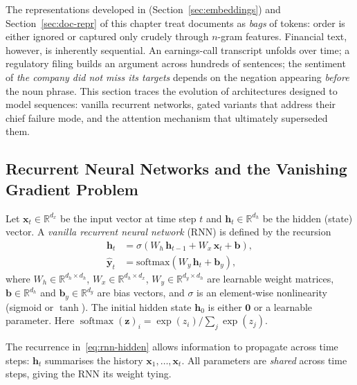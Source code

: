 \begin{deepdive}

The representations developed in  (Section~\ref{sec:embeddings}) and
Section~\ref{sec:doc-repr} of this chapter treat documents as \emph{bags} of tokens:
order is either ignored or captured only crudely through $n$-gram features.
Financial text, however, is inherently sequential.
An earnings-call transcript unfolds over time; a regulatory filing builds an argument
across hundreds of sentences; the sentiment of \textit{the company did not miss its
targets} depends on the negation appearing \emph{before} the noun phrase.
This section traces the evolution of architectures designed to model sequences:
vanilla recurrent networks, gated variants that address their chief failure mode,
and the attention mechanism that ultimately superseded them.

\subsection{Recurrent Neural Networks and the Vanishing Gradient Problem}
\label{sec:sequential-rnn}

\begin{definition}
\label{def:rnn}
Let $\mathbf{x}_t \in \mathbb{R}^{d_x}$ be the input vector at time step $t$
and $\mathbf{h}_t \in \mathbb{R}^{d_h}$ be the hidden (state) vector.
A \emph{vanilla recurrent neural network} (RNN) is defined by the recursion
\begin{align}
  \mathbf{h}_t &= \sigma\!\left(W_h\,\mathbf{h}_{t-1} + W_x\,\mathbf{x}_t
    + \mathbf{b}\right), \label{eq:rnn-hidden}\\
  \hat{\mathbf{y}}_t &= \mathrm{softmax}\!\left(W_y\,\mathbf{h}_t
    + \mathbf{b}_y\right), \label{eq:rnn-output}
\end{align}
where $W_h \in \mathbb{R}^{d_h \times d_h}$, $W_x \in \mathbb{R}^{d_h \times d_x}$,
$W_y \in \mathbb{R}^{d_y \times d_h}$ are learnable weight matrices,
$\mathbf{b} \in \mathbb{R}^{d_h}$ and $\mathbf{b}_y \in \mathbb{R}^{d_y}$ are
bias vectors, and $\sigma$ is an element-wise nonlinearity (sigmoid or $\tanh$).
The initial hidden state $\mathbf{h}_0$ is either $\mathbf{0}$ or a learnable
parameter.
Here $\operatorname{softmax}(\mathbf{z})_i = \exp(z_i)/\sum_j \exp(z_j)$.
\end{definition}

The recurrence in~\eqref{eq:rnn-hidden} allows information to propagate across time
steps: $\mathbf{h}_t$ summarises the history $\mathbf{x}_1, \ldots, \mathbf{x}_t$.
All parameters are \emph{shared} across time steps, giving the RNN its weight tying.


\end{deepdive}
